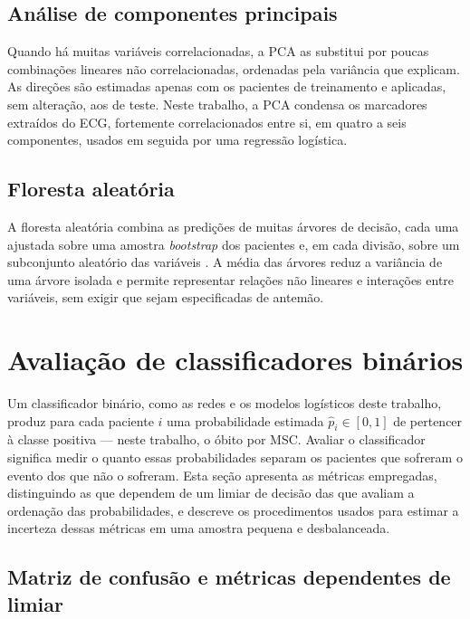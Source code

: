 \subsection{Análise de componentes principais}
\label{subsec:fund-pca}

Quando há muitas variáveis correlacionadas, a \gls{PCA} as substitui por
poucas combinações lineares não correlacionadas, ordenadas pela variância
que explicam. As direções são estimadas apenas com os pacientes de
treinamento e aplicadas, sem alteração, aos de teste. Neste trabalho, a
\gls{PCA} condensa os marcadores extraídos do \gls{ECG}, fortemente
correlacionados entre si, em quatro a seis componentes, usados em seguida
por uma regressão logística.

\subsection{Floresta aleatória}
\label{subsec:fund-floresta}

A floresta aleatória combina as predições de muitas árvores de decisão,
cada uma ajustada sobre uma amostra \textit{bootstrap} dos pacientes e, em
cada divisão, sobre um subconjunto aleatório das variáveis
\cite{breiman2001random}. A média das árvores reduz a variância de uma
árvore isolada e permite representar relações não lineares e interações
entre variáveis, sem exigir que sejam especificadas de antemão.

\section{Avaliação de classificadores binários}
\label{sec:fund-metricas}

Um classificador binário, como as redes e os modelos logísticos deste
trabalho, produz para cada paciente $i$ uma probabilidade estimada
$\hat{p}_i \in [0, 1]$ de pertencer à classe positiva --- neste trabalho, o
óbito por \gls{MSC}. Avaliar o classificador significa medir o quanto essas
probabilidades separam os pacientes que sofreram o evento dos que não o
sofreram. Esta seção apresenta as métricas empregadas, distinguindo as que
dependem de um limiar de decisão das que avaliam a ordenação das
probabilidades, e descreve os procedimentos usados para estimar a incerteza
dessas métricas em uma amostra pequena e desbalanceada.

\subsection{Matriz de confusão e métricas dependentes de limiar}
\label{subsec:fund-confusao}

